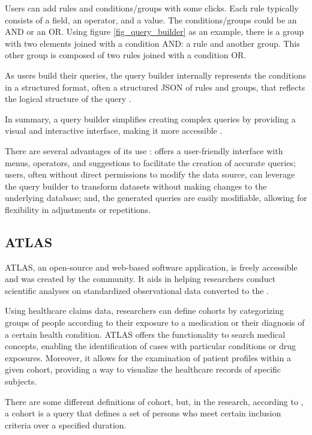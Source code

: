 Users can add rules and conditions/groups with some clicks. Each rule typically consists of a field, an operator, and a value. The conditions/groups could be an AND or an OR. Using figure \ref{fig_query_builder} as an example, there is a group with two elements joined with a condition AND: a rule and another group. This other group is composed of two rules joined with a condition OR.

As users build their queries, the query builder internally represents the conditions in a structured format, often a structured JSON of rules and groups, that reflects the logical structure of the query \cite{noauthor_jquery_nodate}.

In summary, a query builder simplifies creating complex queries by providing a visual and interactive interface, making it more accessible \cite{noauthor_introducing_2021}.

There are several advantages of its use \cite{noauthor_introducing_2021}: offers a user-friendly interface with menus, operators, and suggestions to facilitate the creation of accurate queries; users, often without direct permissions to modify the data source, can leverage the query builder to transform datasets without making changes to the underlying database; and, the generated queries are easily modifiable, allowing for flexibility in adjustments or repetitions.


\subsection{ATLAS}


ATLAS, an open-source and web-based software application, is freely accessible and was created by the {\ohdsi} community. It aids in helping researchers conduct scientific analyses on standardized observational data converted to the {\omop}.

Using healthcare claims data, researchers can define cohorts by categorizing groups of people according to their exposure to a medication or their diagnosis of a certain health condition. ATLAS offers the functionality to search medical concepts, enabling the identification of cases with particular conditions or drug exposures. Moreover, it allows for the examination of patient profiles within a given cohort, providing a way to visualize the healthcare records of specific subjects.

There are some different definitions of cohort, but, in the {\ohdsi} research, according to \citet{informatics_chapter_nodate}, a cohort is a query that defines a set of persons who meet certain inclusion criteria over a specified duration.

